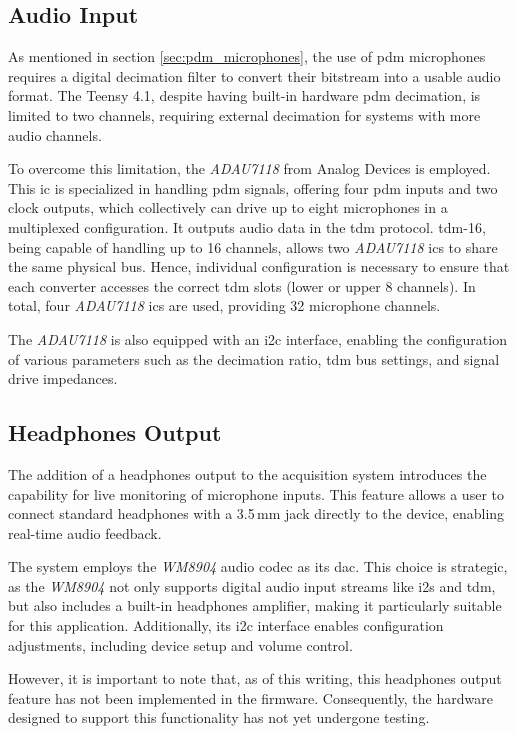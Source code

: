 \subsection{Audio Input}
As mentioned in section \ref{sec:pdm_microphones}, the use of \acrshort{pdm} microphones requires a digital decimation filter to convert their bitstream into a usable audio format.
The Teensy 4.1, despite having built-in hardware \acrshort{pdm} decimation, is limited to two channels, requiring external decimation for systems with more audio channels.

To overcome this limitation, the \textit{ADAU7118} from Analog Devices is employed.
This \acrfull{ic} is specialized in handling \acrshort{pdm} signals, offering four \acrshort{pdm} inputs and two clock outputs, which collectively can drive up to eight microphones in a multiplexed configuration.
It outputs audio data in the \acrshort{tdm} protocol.
\acrshort{tdm}-16, being capable of handling up to 16 channels, allows two \textit{ADAU7118} \acrshort{ic}s to share the same physical bus.
Hence, individual configuration is necessary to ensure that each converter accesses the correct \acrshort{tdm} slots (lower or upper 8 channels).
In total, four \textit{ADAU7118} \acrshort{ic}s are used, providing 32 microphone channels.

The \textit{ADAU7118} is also equipped with an \acrshort{i2c} interface, enabling the configuration of various parameters such as the decimation ratio,
\acrshort{tdm} bus settings, and signal drive impedances.


\subsection{Headphones Output}
The addition of a headphones output to the acquisition system introduces the capability for live monitoring of microphone inputs.
This feature allows a user to connect standard headphones with a 3.5\,mm jack directly to the device, enabling real-time audio feedback.

The system employs the \textit{WM8904} audio \acrshort{codec} as its \acrfull{dac}.
This choice is strategic, as the \textit{WM8904} not only supports digital audio input streams like \acrshort{i2s} and \acrshort{tdm},
but also includes a built-in headphones amplifier, making it particularly suitable for this application.
Additionally, its \acrshort{i2c} interface enables configuration adjustments, including device setup and volume control.

However, it is important to note that, as of this writing, this headphones output feature has not been implemented in the firmware.
Consequently, the hardware designed to support this functionality has not yet undergone testing.


